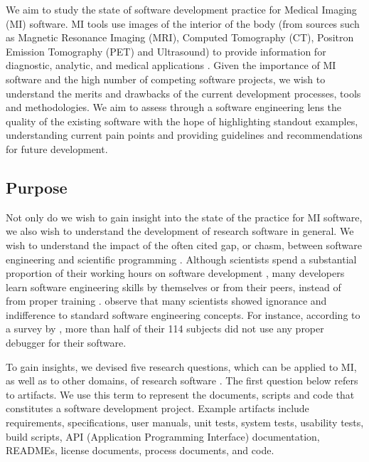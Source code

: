 \documentclass[final, 3p, times, authoryear]{elsarticle}
\begin{document}
We aim to study the state of software development practice for Medical Imaging
(MI) software.  MI tools use images of the interior of the body (from sources
such as Magnetic Resonance Imaging (MRI), Computed Tomography (CT), Positron
Emission Tomography (PET) and Ultrasound) to provide information for diagnostic,
analytic, and medical applications \citep{FDA2021, enwiki:1034887445,
Zhang2008}.  Given the importance of MI software and the high number of
competing software projects, we wish to understand the merits and drawbacks of
the current development processes, tools and methodologies.  We aim to assess
through a software engineering lens the quality of the existing software with
the hope of highlighting standout examples, understanding current pain points
and providing guidelines and recommendations for future development.

\subsection{Purpose} \label{sec_motivation}

Not only do we wish to gain insight into the state of the practice for MI
software, we also wish to understand the development of research software in
general. We wish to understand the impact of the often cited gap, or chasm,
between software engineering and scientific programming \citep{Storer2017}.
Although scientists spend a substantial proportion of their working hours on
software development \citep{Hannay2009, Prabhu2011}, many developers learn
software engineering skills by themselves or from their peers, instead of from
proper training \citep{Hannay2009}. \citet{Hannay2009} observe that many
scientists showed ignorance and indifference to standard software engineering
concepts. For instance, according to a survey by \citet{Prabhu2011}, more than
half of their 114 subjects did not use any proper debugger for their software.

To gain insights, we devised five research questions, which can be applied to
MI, as well as to other domains, of research software \citep{SmithEtAl2021}. The
first question below refers to artifacts.  We use this term to represent the
documents, scripts and code that constitutes a software development project.
Example artifacts include requirements, specifications, user manuals, unit
tests, system tests, usability tests, build scripts, API (Application
Programming Interface) documentation, READMEs, license documents, process
documents, and code.
\end{document}
